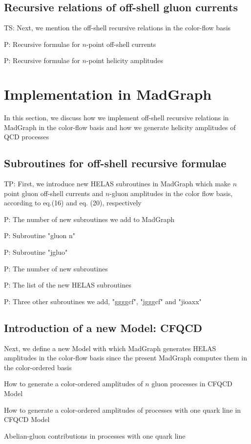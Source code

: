 \documentclass{book}
\begin{document}
\subsection{Recursive relations of off-shell gluon currents}
TS: Next, we mention the off-shell recursive relations in the color-flow basis

P: Recursive formulae for $n$-point off-shell currents

P: Recursive formulae for $n$-point helicity amplitudes

\section{Implementation in MadGraph}
In this section, we discuss how we implement off-shell recursive relations in MadGraph in the color-flow basis and how we generate helicity amplitudes of QCD processes

\subsection{Subroutines for off-shell recursive formulae}
TP: First,  we introduce new HELAS subroutines in MadGraph which make $n$ point gluon off-shell currents and $n$-gluon amplitudes in the color flow basis, according to eq.(16) and eq. (20), respectively

P: The number of new subroutines we add to MadGraph

P: Subroutine "gluon n"

P: Subroutine "jgluo"

P: The number of new subroutines

P: The list of the new HELAS subroutines

P: Three other subroutines we add, "ggggcf", "jgggcf" and "jioaxx"

\subsection{Introduction of a new Model: CFQCD}
Next, we define a new Model with which MadGraph generates HELAS amplitudes in the color-flow basis since the present MadGraph computes them in the color-ordered basis

How to generate a color-ordered amplitudes of $n$ gluon processes in CFQCD Model

How to generate a color-ordered amplitudes of processes with one quark line in CFQCD Model

Abelian-gluon contributions in processes with one quark line
\end{document}
